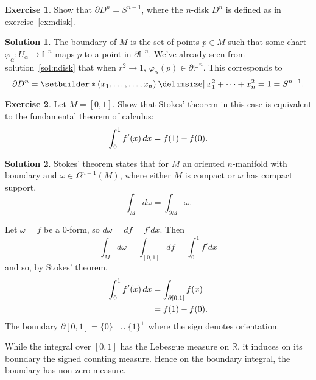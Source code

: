 \documentclass[11pt, a4paper]{report}
\theoremstyle{definition}
\newtheorem{exercise}{Exercise}[part]
\newtheorem{solution}{Solution}[part]
\newenvironment{ex}{\begin{exercise}}{\end{exercise}\pagebreak[1]}
\newenvironment{sol}{\begin{solution}}{\end{solution}\pagebreak[3]}
\newenvironment{nowidthtags}{\usetagform{nowidth}}{\ignorespacesafterend}
\renewcommand*{\d}{\ensuremath\mathop{}\mathopen{}d}
\begin{document}
\begin{ex}

Show that $\partial D^n = S^{n - 1}$, where the $n$-disk $D^n$ is defined as in exercise~\ref{ex:ndisk}.

\end{ex}

\begin{sol}

The boundary of $M$ is the set of points $p \in M$ such that some chart $\varphi_\alpha: U_\alpha \to \mathbb{H}^n$ maps $p$ to a point in $\partial\mathbb{H}^n$.
We've already seen from solution~\ref{sol:ndisk} that when $r^2 \to 1$, $\varphi_\alpha(p) \in \partial\mathbb{H}^n$. This corresponds to
\[
    \partial D^n = \setbuilder*{(x_1, \ldots, \ldots, x_n) \given x_1^2 + \cdots + x_n^2 = 1} = S^{n - 1}.
\]

\end{sol}

\begin{ex}

Let $M = [0, 1]$. Show that Stokes' theorem in this case is equivalent to the fundamental theorem of calculus:
\[
    \int_0^1 f'(x) \d x = f(1) - f(0).
\]

\end{ex}

\begin{sol}

Stokes' theorem states that for $M$ an oriented $n$-manifold with boundary and $\omega \in \Omega^{n - 1}(M)$, where either $M$ is compact or $\omega$ has compact support,
\begin{nowidthtags}
\[
    \int_M d\omega = \int_{\partial M} \omega. \tag{Stokes' theorem}\label{eq:stokestheorem}
\]
\end{nowidthtags}

Let $\omega = f$ be a 0-form, so $d\omega = df = f' dx$. Then
\[
    \int_M d\omega = \int_{[0, 1]} df = \int_0^1 f' dx
\]
and so, by Stokes' theorem,
\begin{align*}
\int_0^1 f'(x) \d x &= \int_{\partial [0, 1]} f(x) \\
                    &= f(1) - f(0).
\end{align*}
The boundary $\partial [0, 1] = {\{0\}}^-\! \cup {\{1\}}^+$ where the sign denotes orientation.

While the integral over $[0, 1]$ has the Lebesgue measure on $\mathbb{R}$, it induces on its boundary the signed counting measure. Hence on the boundary integral, the boundary has non-zero measure.

\end{sol}
\end{document}
